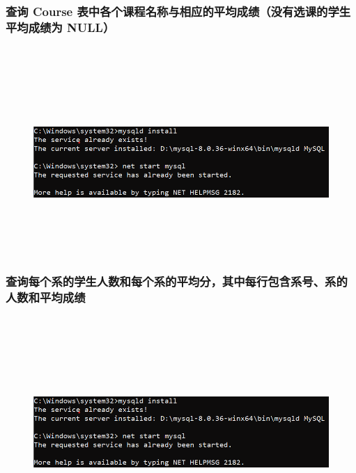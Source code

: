 \documentclass{ctexart}
\begin{document}
\subsubsection{查询 Course 表中各个课程名称与相应的平均成绩（没有选课的学生平均成绩为 NULL） }
\begin{lstlisting}[language=sql]
	
\end{lstlisting}
\begin{figure}[H]
	\centering 
	\includegraphics[height=7cm,width=14cm]{1.png}
	\end{figure}
\subsubsection{查询每个系的学生人数和每个系的平均分，其中每行包含系号、系的人数和平均成绩}
\begin{lstlisting}[language=sql]
	
\end{lstlisting}
\begin{figure}[H]
	\centering 
	\includegraphics[height=7cm,width=14cm]{1.png}
	\end{figure}
\end{document}
